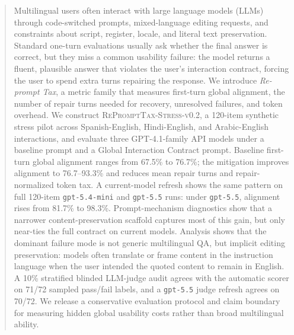 \begin{abstract}
Multilingual users often interact with large language models (LLMs) through
code-switched prompts, mixed-language editing requests, and constraints about
script, register, locale, and literal text preservation. Standard one-turn
evaluations usually ask whether the final answer is correct, but they miss a
common usability failure: the model returns a fluent, plausible answer that
violates the user's interaction contract, forcing the user to spend extra turns
repairing the response. We introduce \emph{Re-prompt Tax}, a metric family that
measures first-turn global alignment, the number of repair turns needed for
recovery, unresolved failures, and token overhead. We construct
\textsc{RePromptTax-Stress-v0.2}, a 120-item synthetic stress pilot across
Spanish-English, Hindi-English, and Arabic-English interactions, and evaluate
three GPT-4.1-family API models under a baseline prompt and a Global Interaction
Contract prompt. Baseline first-turn global alignment ranges from 67.5\% to
76.7\%; the mitigation improves alignment to 76.7--93.3\% and reduces mean
repair turns and repair-normalized token tax. A current-model refresh shows the
same pattern on full 120-item \texttt{gpt-5.4-mini} and \texttt{gpt-5.5} runs:
under \texttt{gpt-5.5}, alignment rises from 81.7\% to 98.3\%. Prompt-mechanism
diagnostics show that a narrower content-preservation scaffold captures most of
this gain, but only near-ties the full contract on current models. Analysis
shows that the dominant failure mode is not generic multilingual QA, but
implicit editing preservation: models often translate or frame content in the
instruction language when the user intended the quoted content to remain in
English. A 10\% stratified blinded
LLM-judge audit agrees with the automatic scorer on 71/72 sampled pass/fail
labels, and a \texttt{gpt-5.5} judge refresh agrees on 70/72. We release a
conservative evaluation protocol and claim boundary for
measuring hidden global usability costs rather than broad multilingual ability.
\end{abstract}
